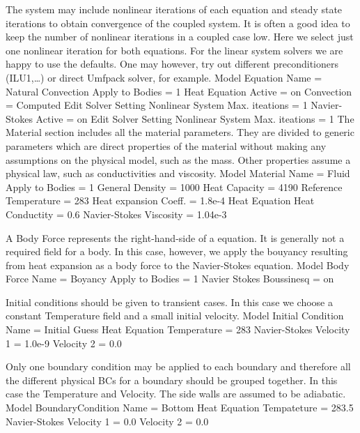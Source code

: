The system may include nonlinear iterations of each equation and steady state iterations 
to obtain convergence of the coupled system. It is often a good idea to keep the number of 
nonlinear iterations in a coupled case low. Here we select just one nonlinear iteration
for both equations.
For the linear system solvers we are happy to use the defaults. One may however, try out different
preconditioners (ILU1,\ldots) or direct Umfpack solver, for example.
\ttbegin
Model
  Equation
    Name = Natural Convection
    Apply to Bodies = 1
    Heat Equation
      Active = on
      Convection = Computed
      Edit Solver Setting
        Nonlinear System
          Max. iteations = 1
    Navier-Stokes 
      Active = on
      Edit Solver Setting
        Nonlinear System
          Max. iteations = 1
\ttend        
The Material section includes all the material parameters.
They are divided to generic parameters which are direct properties of the material
without making any assumptions on the physical model, such as the mass. Other properties assume
a physical law, such as conductivities and viscosity.      
\ttbegin
Model
  Material
    Name = Fluid
    Apply to Bodies = 1 
    General    
      Density = 1000
      Heat Capacity = 4190
      Reference Temperature = 283
      Heat expansion Coeff. = 1.8e-4
    Heat Equation
      Heat Conductity = 0.6
    Navier-Stokes
      Viscosity = 1.04e-3
\ttend

A Body Force represents the right-hand-side of a equation. It is generally 
not a required field for a body. In this case, however, we apply the bouyancy resulting from
heat expansion as a body force to the Navier-Stokes equation.
\ttbegin
Model
  Body Force
    Name = Boyancy
    Apply to Bodies = 1
    Navier Stokes
      Boussinesq = on
\ttend    

Initial conditions should be given to transient cases. In this case we choose a constant Temperature field
and a small initial velocity. 
\ttbegin
Model
  Initial Condition 
    Name = Initial Guess
    Heat Equation
      Temperature = 283
    Navier-Stokes
      Velocity 1 = 1.0e-9
      Velocity 2 = 0.0
\ttend

Only one boundary condition may be applied to each boundary and therefore all the 
different physical BCs for a boundary should be grouped together. In this case the
Temperature and Velocity. The side walls are assumed to be adiabatic.
\ttbegin
Model
  BoundaryCondition
    Name = Bottom
    Heat Equation
      Tempateture = 283.5
    Navier-Stokes 
      Velocity 1 = 0.0
      Velocity 2 = 0.0
 
